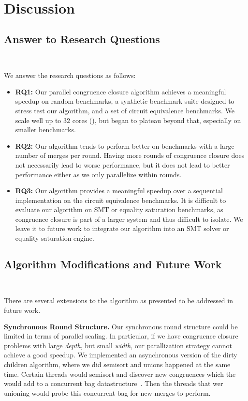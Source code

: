 \section{Discussion}
\label{sec:discussion}

\subsection{Answer to Research Questions}~\label{sec:disc:rq}

We answer the research questions as follows:

\begin{itemize}
  \item \textbf{RQ1:} Our parallel congruence closure algorithm achieves a
  meaningful speedup on random benchmarks, a synthetic benchmark suite designed
  to stress test our algorithm, and a set of circuit equivalence benchmarks. We 
  scale well up to 32 cores (), but began to plateau beyond
  that, especially on smaller benchmarks.
  \item \textbf{RQ2:} Our algorithm tends to perform better on benchmarks with a
  large number of merges per round. Having more rounds of congruence closure
  does not necessarily lead to worse performance, but it does not lead to better
  performance either as we only parallelize within rounds.
  \item \textbf{RQ3:} Our algorithm provides a meaningful speedup over a
  sequential implementation on the circuit equivalence benchmarks. It is difficult
  to evaluate our algorithm on SMT or equality saturation benchmarks, as congruence
  closure is part of a larger system and thus difficult to isolate. We leave it to
  future work to integrate our algorithm into an SMT solver or equality saturation
  engine.
\end{itemize}

\subsection{Algorithm Modifications and Future Work}~\label{sec:disc:limit-alg}

There are several extensions to the algorithm as presented to be addressed in 
future work.

\textbf{Synchronous Round Structure.} Our synchronous round structure could be
limited in terms of parallel scaling. In particular, if we have congruence
closure problems with large \emph{depth}, but small \emph{width}, our
parallization strategy cannot achieve a good speedup. We implemented an
asynchronous version of the dirty children algorithm, where we did semisort and
unions happened at the same time. Certain threads would semisort and discover
new congruences which the would add to a concurrent bag
datastructure~\cite{concurrentbag}. Then the threads that wer unioning would
probe this concurrent bag for new merges to perform.

